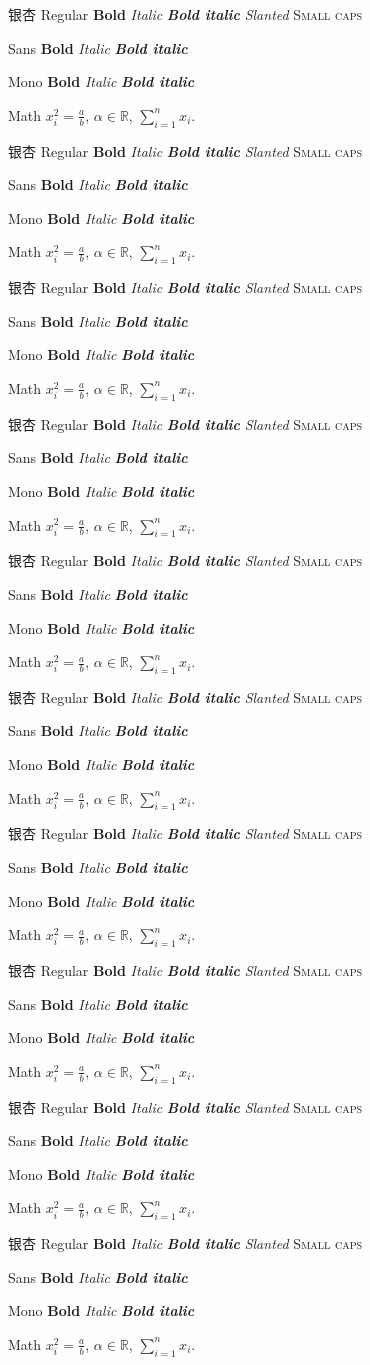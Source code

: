 \newcommand{\fontsample}{
银杏 Regular \textbf{Bold} \textit{Italic} \textbf{\textit{Bold italic}}
\textsl{Slanted} \textsc{Small caps}\par
{\sffamily Sans \textbf{Bold} \textit{Italic} \textbf{\textit{Bold italic}}}\par
{\ttfamily Mono \textbf{Bold} \textit{Italic} \textbf{\textit{Bold italic}}}\par
Math \(x_i^2=\frac{a}{b}\), \(\alpha\in\mathbb{R}\), \(\sum_{i=1}^{n} x_i\).\par
}
{\tiny\fontsample}
{\scriptsize\fontsample}
{\footnotesize\fontsample}
{\small\fontsample}
{\normalsize\fontsample}
{\large\fontsample}
{\Large\fontsample}
{\LARGE\fontsample}
{\huge\fontsample}
{\Huge\fontsample}

